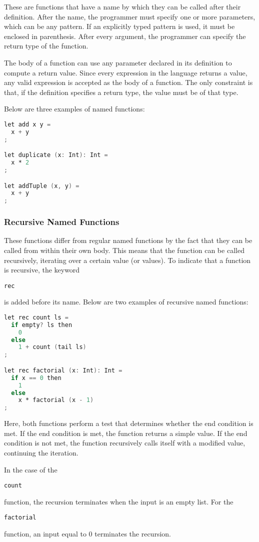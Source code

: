 \documentclass{article}
\def\code#1{\begin{footnotesize}\texttt{#1}\end{footnotesize}}
\begin{document}
These are functions that have a name by which they can be called after their definition.
After the name, the programmer must specify one or more parameters, which can be any pattern.
If an explicitly typed pattern is used, it must be enclosed in parenthesis.
After every argument, the programmer can specify the return type of the function.

The body of a function can use any parameter declared in its definition to compute a return value.
Since every expression in the language returns a value, any valid expression is accepted as the body of a function.
The only constraint is that, if the definition specifies a return type, the value must be of that type.

Below are three examples of named functions:

\begin{lstlisting}[language=V]
let add x y =
  x + y
;

let duplicate (x: Int): Int =
  x * 2
;

let addTuple (x, y) =
  x + y
;
\end{lstlisting}

\subsubsection{Recursive Named Functions}

These functions differ from regular named functions by the fact that they can be called from within their own body.
This means that the function can be called recursively, iterating over a certain value (or values).
To indicate that a function is recursive, the keyword \code{rec} is added before its name.
Below are two examples of recursive named functions:

\begin{lstlisting}[language=V]
let rec count ls =
  if empty? ls then
    0
  else
    1 + count (tail ls)
;

let rec factorial (x: Int): Int =
  if x == 0 then
    1
  else
    x * factorial (x - 1)
;
\end{lstlisting}

Here, both functions perform a test that determines whether the end condition is met.
If the end condition is met, the function returns a simple value.
If the end condition is not met, the function recursively calls itself with a modified value, continuing the iteration.

In the case of the \code{count} function, the recursion terminates when the input is an empty list.
For the \code{factorial} function, an input equal to 0 terminates the recursion.
\end{document}
